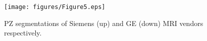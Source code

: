  \begin{figure}[h]
    \centering
    \texttt{[image: figures/Figure5.eps]}
    \label{fig:ressegpz}
    \caption{PZ segmentations of Siemens (up) and GE (down) MRI vendors respectively. }
\end{figure} 


